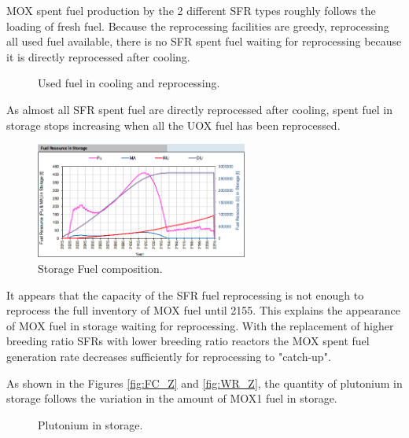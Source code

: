\documentclass[12pt]{article}
\begin{document}
MOX spent fuel production by the 2 different SFR types roughly follows the
loading of fresh fuel.  Because the reprocessing facilities are greedy,
reprocessing all used fuel available, there is no SFR spent fuel waiting for reprocessing
because it is directly reprocessed after cooling.

\begin{figure}[h!]
    \centering
    \caption{Used fuel in cooling and reprocessing.\label{fig:cool_reprocc} }
\end{figure}

As almost all SFR spent fuel are directly reprocessed after cooling, spent
fuel in storage stops increasing when all the UOX fuel has been reprocessed.

\begin{figure}[h!]
    \centering
    \includegraphics[width=0.62\textwidth]{img/FuelInStorage_1}
    \caption{Storage Fuel composition.}
    \label{fig:storagecompo_1}
\end{figure}

It appears that the capacity of the SFR fuel reprocessing is not enough to
reprocess the full inventory of MOX fuel until 2155. This explains the
appearance of MOX fuel in storage waiting for reprocessing. With the
replacement of higher breeding ratio SFRs with lower breeding ratio reactors
the MOX spent fuel generation rate decreases sufficiently for reprocessing to
"catch-up".

As shown in the Figures \ref{fig:FC_Z} and \ref{fig:WR_Z}, the quantity of
plutonium in storage follows the variation in the amount of MOX1 fuel in
storage.

\begin{figure}[h!]
    \centering
    \caption{Plutonium in storage.\label{fig:FC_WR_zoom} }
\end{figure}
\end{document}
